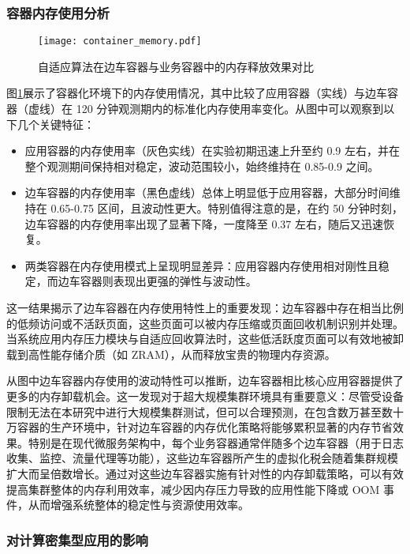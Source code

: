 \subsubsection{容器内存使用分析}
\begin{figure}[htbp]
    \centering
    \texttt{[image: container\_memory.pdf]}
    \caption{自适应算法在边车容器与业务容器中的内存释放效果对比}
    \label{fig:container_memory}
\end{figure}
图\ref{fig:container_memory}展示了容器化环境下的内存使用情况，其中比较了应用容器（实线）与边车容器（虚线）在 120 分钟观测期内的标准化内存使用率变化。从图中可以观察到以下几个关键特征：
\begin{itemize}
    \item 应用容器的内存使用率（灰色实线）在实验初期迅速上升至约 0.9 左右，并在整个观测期间保持相对稳定，波动范围较小，始终维持在 0.85-0.9 之间。
    \item 边车容器的内存使用率（黑色虚线）总体上明显低于应用容器，大部分时间维持在 0.65-0.75 区间，且波动性更大。特别值得注意的是，在约 50 分钟时刻，边车容器的内存使用率出现了显著下降，一度降至 0.37 左右，随后又迅速恢复。
    \item 两类容器在内存使用模式上呈现明显差异：应用容器内存使用相对刚性且稳定，而边车容器则表现出更强的弹性与波动性。
\end{itemize}

这一结果揭示了边车容器在内存使用特性上的重要发现：边车容器中存在相当比例的低频访问或不活跃页面，这些页面可以被内存压缩或页面回收机制识别并处理。当系统应用内存压力模块与自适应回收算法时，这些低活跃度页面可以有效地被卸载到高性能存储介质（如 ZRAM），从而释放宝贵的物理内存资源。

从图中边车容器内存使用的波动特性可以推断，边车容器相比核心应用容器提供了更多的内存卸载机会。这一发现对于超大规模集群环境具有重要意义：尽管受设备限制无法在本研究中进行大规模集群测试，但可以合理预测，在包含数万甚至数十万容器的生产环境中，针对边车容器的内存优化策略将能够累积显著的内存节省效果。特别是在现代微服务架构中，每个业务容器通常伴随多个边车容器（用于日志收集、监控、流量代理等功能），这些边车容器所产生的虚拟化税会随着集群规模扩大而呈倍数增长。通过对这些边车容器实施有针对性的内存卸载策略，可以有效提高集群整体的内存利用效率，减少因内存压力导致的应用性能下降或 OOM 事件，从而增强系统整体的稳定性与资源使用效率。

\subsubsection{对计算密集型应用的影响}

